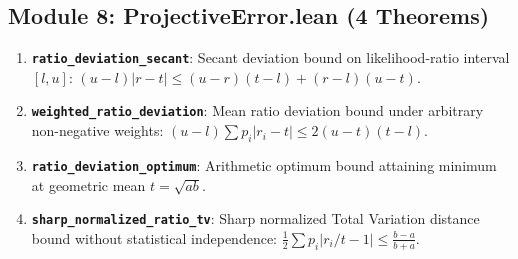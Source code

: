 \documentclass[11pt,a4paper]{article}
\theoremstyle{definition}
\begin{document}
\subsection{Module 8: ProjectiveError.lean (4 Theorems)}
\begin{enumerate}
    \item \textbf{\texttt{ratio\_deviation\_secant}}: Secant deviation bound on likelihood-ratio interval $[l, u]$: $(u - l)|r - t| \le (u - r)(t - l) + (r - l)(u - t)$.
    \item \textbf{\texttt{weighted\_ratio\_deviation}}: Mean ratio deviation bound under arbitrary non-negative weights: $(u - l)\sum p_i |r_i - t| \le 2(u - t)(t - l)$.
    \item \textbf{\texttt{ratio\_deviation\_optimum}}: Arithmetic optimum bound attaining minimum at geometric mean $t = \sqrt{ab}$.
    \item \textbf{\texttt{sharp\_normalized\_ratio\_tv}}: Sharp normalized Total Variation distance bound without statistical independence: $\frac{1}{2}\sum p_i |r_i/t - 1| \le \frac{b-a}{b+a}$.
\end{enumerate}
\end{document}

